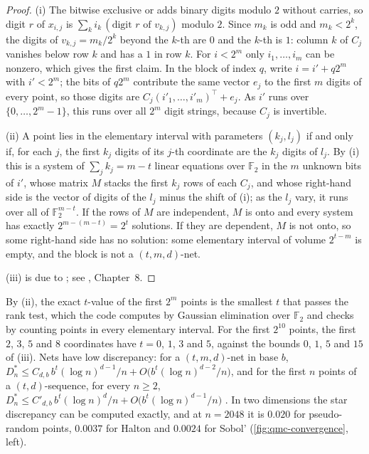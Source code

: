\begin{proof}
(i) The bitwise exclusive or adds binary digits modulo $2$ without carries, so digit $r$ of
$x_{i,j}$ is $\sum_ki_k\,(\text{digit $r$ of }v_{k,j})$ modulo $2$. Since $m_k$ is odd and
$m_k<2^k$, the digits of $v_{k,j}=m_k/2^k$ beyond the $k$-th are $0$ and the $k$-th is $1$:
column $k$ of $C_j$ vanishes below row $k$ and has a $1$ in row $k$. For $i<2^m$ only
$i_1,\dots,i_m$ can be nonzero, which gives the first claim. In the block of index $q$, write
$i=i'+q2^m$ with $i'<2^m$; the bits of $q2^m$ contribute the same vector $e_j$ to the first $m$
digits of every point, so those digits are $C_j(i'_1,\dots,i'_m)^\top+e_j$. As $i'$ runs over
$\{0,\dots,2^m-1\}$, this runs over all $2^m$ digit strings, because $C_j$ is invertible.

(ii) A point lies in the elementary interval with parameters $(k_j,l_j)$ if and only if, for
each $j$, the first $k_j$ digits of its $j$-th coordinate are the $k_j$ digits of $l_j$. By (i)
this is a system of $\sum_jk_j=m-t$ linear equations over $\mathbb F_2$ in the $m$ unknown bits of
$i'$, whose matrix $M$ stacks the first $k_j$ rows of each $C_j$, and whose right-hand side is the
vector of digits of the $l_j$ minus the shift of (i); as the $l_j$ vary, it runs over all of
$\mathbb F_2^{m-t}$. If the rows of $M$ are independent, $M$ is onto and every system has exactly
$2^{m-(m-t)}=2^t$ solutions. If they are dependent, $M$ is not onto, so some right-hand side has no
solution: some elementary interval of volume $2^{t-m}$ is empty, and the block is not a
$(t,m,d)$-net.

(iii) is due to \textcite{sobol-1967}; see \textcite{dick-pillichshammer}, Chapter~8.
\end{proof}

By (ii), the exact $t$-value of the first $2^m$ points is the smallest $t$ that passes the rank
test, which the code computes by Gaussian elimination over $\mathbb F_2$ and checks by counting
points in every elementary interval. For the first $2^{10}$ points, the
first $2$, $3$, $5$ and $8$ coordinates have $t=0$, $1$, $3$ and $5$, against the bounds $0$, $1$,
$5$ and $15$ of (iii). Nets have low discrepancy: for a $(t,m,d)$-net in base $b$,
$D^*_n\le C_{d,b}\,b^t(\log n)^{d-1}/n+O\big(b^t(\log n)^{d-2}/n\big)$, and for the first $n$ points
of a $(t,d)$-sequence, for every $n\ge2$,
$D^*_n\le C'_{d,b}\,b^t(\log n)^d/n+O\big(b^t(\log n)^{d-1}/n\big)$
\citep[Chapter~4; Theorem~4.17 for sequences]{niederreiter-qmc}. In two dimensions the star discrepancy can be
computed exactly, and at $n=2048$ it is $0.020$ for pseudo-random points, $0.0037$ for Halton and
$0.0024$ for Sobol' (\cref{fig:qmc-convergence}, left).

